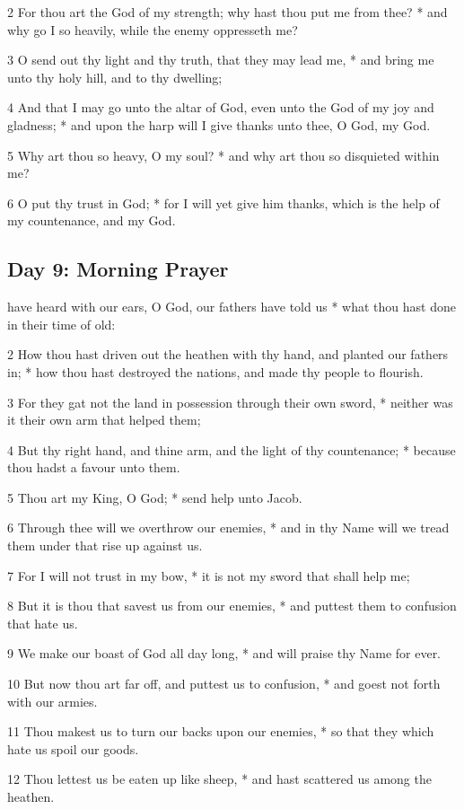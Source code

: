2 For thou art the God of my strength; why hast thou put me from thee? * and why go I so heavily, while the enemy oppresseth me?\par
3 O send out thy light and thy truth, that they may lead me, * and bring me unto thy holy hill, and to thy dwelling;\par
4 And that I may go unto the altar of God, even unto the God of my joy and gladness; * and upon the harp will I give thanks unto thee, O God, my God.\par
5 Why art thou so heavy, O my soul? * and why art thou so disquieted within me?\par
6 O put thy trust in God; * for I will yet give him thanks, which is the help of my countenance, and my God.
\subsection{Day 9: Morning Prayer}
 have heard with our ears, O God, our fathers have told us * what thou hast done in their time of old:\par
2 How thou hast driven out the heathen with thy hand, and planted our fathers in; * how thou hast destroyed the nations, and made thy people to flourish.\par
3 For they gat not the land in possession through their own sword, * neither was it their own arm that helped them;\par
4 But thy right hand, and thine arm, and the light of thy countenance; * because thou hadst a favour unto them.\par
5 Thou art my King, O God; * send help unto Jacob.\par
6 Through thee will we overthrow our enemies, * and in thy Name will we tread them under that rise up against us.\par
7 For I will not trust in my bow, * it is not my sword that shall help me;\par
8 But it is thou that savest us from our enemies, * and puttest them to confusion that hate us.\par
9 We make our boast of God all day long, * and will praise thy Name for ever.\par
10 But now thou art far off, and puttest us to confusion, * and goest not forth with our armies.\par
11 Thou makest us to turn our backs upon our enemies, * so that they which hate us spoil our goods.\par
12 Thou lettest us be eaten up like sheep, * and hast scattered us among the heathen.\par
